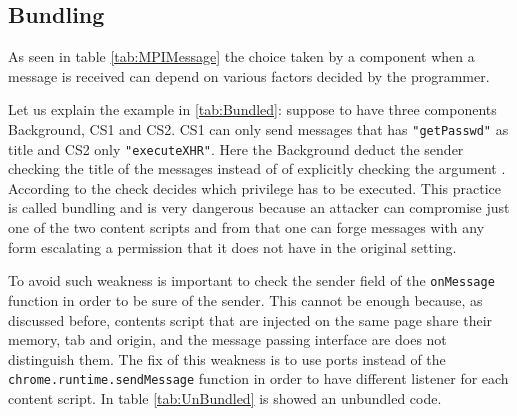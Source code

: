 \subsection{Bundling}
\label{sec:Bundling} 
As seen in table \ref{tab:MPIMessage} the choice taken by a component when a message is received can depend on various factors decided by the programmer.

Let us explain the example in \ref{tab:Bundled}: suppose to have three components Background, CS1 and CS2. CS1 can only send messages that has \texttt{"getPasswd"} as title and CS2 only \texttt{"executeXHR"}. Here the Background deduct the sender checking the title of the messages instead of of explicitly checking the argument . According to the check decides which privilege has to be executed. This practice is called bundling and is very dangerous because an attacker can compromise just one of the two content scripts and from that one can forge messages with any form escalating a permission that it does not have in the original setting.

To avoid such weakness is important to check the sender field of the \texttt{onMessage} function in order to be sure of the sender. This cannot be enough because, as discussed before, contents script that are injected on the same page share their memory, tab and origin, and the message passing interface are does not distinguish them. The fix of this weakness is to use ports instead of the \texttt{chrome.runtime.sendMessage} function in order to have different listener for each content script. In table \ref{tab:UnBundled} is showed an unbundled code.


